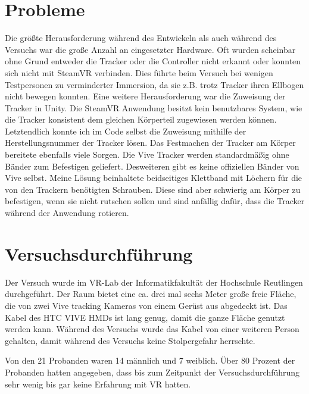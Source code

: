 \section{Probleme}
Die größte Herausforderung während des Entwickeln als auch während des Versuchs war die große Anzahl an eingesetzter Hardware. Oft wurden scheinbar ohne Grund entweder die Tracker oder die Controller nicht erkannt oder konnten sich nicht mit SteamVR verbinden. Dies führte beim Versuch bei wenigen Testpersonen zu verminderter Immersion, da sie z.B. trotz Tracker ihren Ellbogen nicht bewegen konnten. 
Eine weitere Herausforderung war die Zuweisung der Tracker in Unity. Die SteamVR Anwendung besitzt kein benutzbares System, wie die Tracker konsistent dem gleichen Körperteil zugewiesen werden können. Letztendlich konnte ich im Code selbst die Zuweisung mithilfe der Herstellungsnummer der Tracker lösen.
Das Festmachen der Tracker am Körper bereitete ebenfalls viele Sorgen. Die Vive Tracker werden standardmäßig ohne Bänder zum Befestigen geliefert. Desweiteren gibt es keine offiziellen Bänder von Vive selbst. Meine Lösung beinhaltete beidseitiges Klettband mit Löchern für die von den Trackern benötigten Schrauben. Diese sind aber schwierig am Körper zu befestigen, wenn sie nicht rutschen sollen und sind anfällig dafür, dass die Tracker während der Anwendung rotieren.
 

\section{Versuchsdurchführung}
Der Versuch wurde im VR-Lab der Informatikfakultät der Hochschule Reutlingen durchgeführt. Der Raum bietet eine ca. drei mal sechs Meter große freie Fläche, die von zwei Vive tracking Kameras von einem Gerüst aus abgedeckt ist. Das Kabel des HTC VIVE HMDs ist lang genug, damit die ganze Fläche genutzt werden kann. Während des Versuchs wurde das Kabel von einer weiteren Person gehalten, damit während des Versuchs keine Stolpergefahr herrschte.

Von den 21 Probanden waren 14 männlich und 7 weiblich. Über 80 Prozent der Probanden hatten angegeben, dass bis zum Zeitpunkt der Versuchsdurchführung sehr wenig bis gar keine Erfahrung mit VR hatten.




 
 

